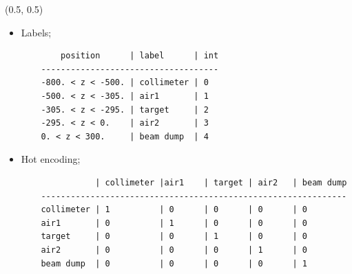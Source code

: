 \documentclass[12pt, xcolor={dvipsnames}, aspectratio = 169]{beamer}
\begin{document}
\begin{frame}[fragile]
\begin{textblock}{14.0}(0.5, 0.5)

\begin{itemize}

    \item Labels;
    \begin{small}
    \begin{verbatim}
        position      | label      | int
    ------------------------------------
    -800. < z < -500. | collimeter | 0
    -500. < z < -305. | air1       | 1
    -305. < z < -295. | target     | 2
    -295. < z < 0.    | air2       | 3
    0. < z < 300.     | beam dump  | 4
    \end{verbatim}
    \end{small}
    \item Hot encoding;
    \begin{small}
    \begin{verbatim}
               | collimeter |air1    | target | air2   | beam dump
    --------------------------------------------------------------
    collimeter | 1          | 0      | 0      | 0      | 0
    air1       | 0          | 1      | 0      | 0      | 0
    target     | 0          | 0      | 1      | 0      | 0
    air2       | 0          | 0      | 0      | 1      | 0
    beam dump  | 0          | 0      | 0      | 0      | 1
    \end{verbatim}
    \end{small}
\end{itemize}

\end{textblock}
\end{frame}
\end{document}
